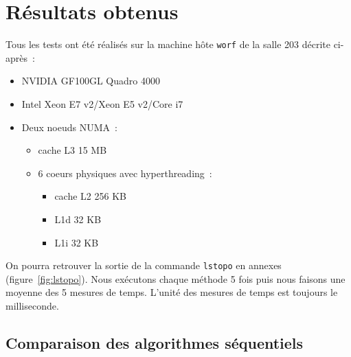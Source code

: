 \section {Résultats obtenus}

Tous les tests ont été réalisés sur la machine hôte \texttt{worf} de
la salle 203 décrite ci-après~:
\begin{itemize}
\item NVIDIA GF100GL Quadro 4000
\item Intel Xeon E7 v2/Xeon E5 v2/Core i7
\item Deux noeuds NUMA~:
  \begin{itemize}
  \item cache L3 15 MB
  \item 6 coeurs physiques avec hyperthreading~:
    \begin{itemize}
    \item cache L2 256 KB
    \item L1d 32 KB
    \item L1i 32 KB
    \end{itemize}
  \end{itemize}
\end{itemize}
On pourra retrouver la sortie de la commande \texttt{lstopo} en
annexes (figure~\ref{fig:lstopo}). Nous exécutons chaque méthode 5
fois puis nous faisons une moyenne des 5 mesures de temps. L'unité des
mesures de temps est toujours le milliseconde.

\subsection{Comparaison des algorithmes séquentiels}

\begin{figure}[!ht]
  \caption{}
  \label{fig:homoseq128}
\end{figure}

